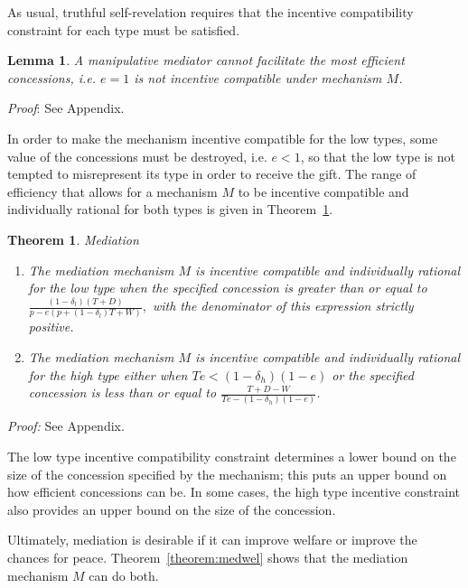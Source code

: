 \documentclass[12pt, letterpaper]{article}
\newcommand{\de}{\delta}
\newtheorem{theorem}{Theorem}
\newtheorem{lemma}{Lemma}
\begin{document}
As usual, truthful self-revelation requires that the incentive compatibility constraint for each type must be satisfied.

\begin{lemma}
	A manipulative mediator cannot facilitate the most efficient concessions, i.e. $e=1$ is not incentive compatible under mechanism $M$. 
	\label{lemma:med}
\end{lemma}
\emph{Proof}: See Appendix.

In order to make the mechanism incentive compatible for the low types, some value of the concessions must be destroyed, i.e. $e<1$, so that the low type is not tempted to misrepresent its type in order to receive the gift. The range of efficiency that allows for a mechanism $M$ to be incentive compatible and individually rational for both types is given in Theorem~\ref{theorem:med}.

\begin{theorem}
\emph{Mediation}
\begin{enumerate}
		\item[(a)] The mediation mechanism $M$ is incentive compatible and individually rational for the low type when the specified concession is greater than or equal to $\frac{\left(1 - \de_l \right)\left(T +D \right)}{p - e\left(p +(1-\de_l)T +W \right)},$ with the denominator of this expression strictly positive.
		\item[(b)] The mediation mechanism $M$ is incentive compatible and individually rational for the high type either when $Te < (1-\de_h)(1-e)$ or the specified concession is less than or equal to $\frac{ T + D - W}{Te - (1-\de_h)(1-e)}$.
\end{enumerate}
	\label{theorem:med}
\end{theorem}
\emph{Proof:} See Appendix.

The low type incentive compatibility constraint determines a lower bound on the size of the concession specified by the mechanism; this puts an upper bound on how efficient concessions can be. In some cases, the high type incentive constraint also provides an upper bound on the size of the concession.

Ultimately, mediation is desirable if it can improve welfare or improve the chances for peace. Theorem~\ref{theorem:medwel} shows that the mediation mechanism $M$ can do both.
\end{document}
